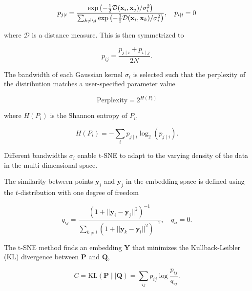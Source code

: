 \documentclass[runningheads]{llncs}
\begin{document}
\begin{equation}
p_{j \mid i} = \frac{\exp \left ( -\frac{1}{2} \mathcal{D}(\mathbf{x}_i, \mathbf{x}_j ) / \sigma_i^2 \right )}
{\sum_{k \neq \i } \exp \left ( -\frac{1}{2} \mathcal{D}(\mathbf{x}_i, \mathbf{x}_k ) / \sigma_i^2 \right )}, \quad p_{i \mid i} = 0
\label{eq:gaussian_kernel}
\end{equation}

\noindent where $\mathcal{D}$ is a distance measure. This is then symmetrized to

\begin{equation}
p_{ij} = \frac{p_{j \mid i} + p_{i \mid j}}{2N}.
\label{eq:symmetrize}
\end{equation}

The bandwidth of each Gaussian kernel $\sigma_i$ is selected such that the
perplexity of the distribution matches a user-specified parameter value

\begin{equation}
\text{Perplexity} = 2^{H(P_i)}
\end{equation}

\noindent where $H(P_i)$ is the Shannon entropy of $P_i$,

\begin{equation}
H(P_i) = -\sum_i p_{j \mid i} \log_2 (p_{j \mid i}).
\end{equation}

\noindent Different bandwidths $\sigma_i$ enable t-SNE to adapt to the varying
density of the data in the multi-dimensional space.

The similarity between points $\mathbf{y}_i$ and $\mathbf{y}_j$ in the
embedding space is defined using the $t$-distribution with one degree of
freedom

\begin{equation}
q_{ij} = \frac{\left ( 1 + || \mathbf{y}_i - \mathbf{y}_j ||^2 \right )^{-1}}
{\sum_{k \neq l}\left ( 1 + || \mathbf{y}_k - \mathbf{y}_l ||^2 \right )^{-1}},
\quad q_{ii} = 0.
\label{eq:cauchy_kernel}
\end{equation}

The t-SNE method finds an embedding $\mathbf{Y}$ that minimizes
the Kullback-Leibler (KL) divergence between $\mathbf{P}$ and $\mathbf{Q}$,

\begin{equation}
C = \text{KL}(\mathbf{P} \mid \mid \mathbf{Q}) = \sum_{ij} p_{ij} \log \frac{p_{ij}}{q_{ij}}.
\label{eq:kl_divergence}
\end{equation}
\end{document}
